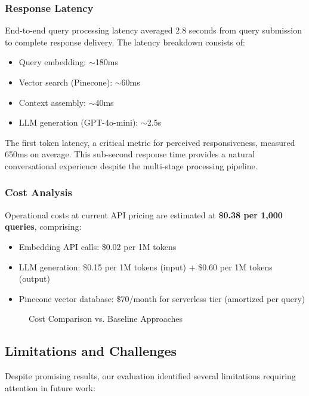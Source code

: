 \documentclass[conference]{IEEEtran}
\begin{document}
\subsubsection{Response Latency}
End-to-end query processing latency averaged 2.8 seconds from query submission to complete response delivery. The latency breakdown consists of:
\begin{itemize}
    \item Query embedding: $\sim$180ms
    \item Vector search (Pinecone): $\sim$60ms
    \item Context assembly: $\sim$40ms
    \item LLM generation (GPT-4o-mini): $\sim$2.5s
\end{itemize}

The first token latency, a critical metric for perceived responsiveness, measured 650ms on average. This sub-second response time provides a natural conversational experience despite the multi-stage processing pipeline.

\subsubsection{Cost Analysis}
Operational costs at current API pricing are estimated at \textbf{\$0.38 per 1,000 queries}, comprising:
\begin{itemize}
    \item Embedding API calls: \$0.02 per 1M tokens
    \item LLM generation: \$0.15 per 1M tokens (input) + \$0.60 per 1M tokens (output)
    \item Pinecone vector database: \$70/month for serverless tier (amortized per query)
\end{itemize}

\begin{figure}[htbp]
\centerline{}
\caption{Cost Comparison vs. Baseline Approaches}
\label{fig:cost}
\end{figure}

\subsection{Limitations and Challenges}
Despite promising results, our evaluation identified several limitations requiring attention in future work:
\end{document}
